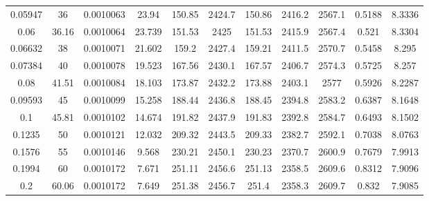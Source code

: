\begin{longtable}{ccccccccccc}
0.05947  & 36          & 0.0010063              & 23.94               & 150.85                 & 2424.7              & 150.86          & 2416.2       & 2567.1       & 0.5188         & 8.3336      \\
0.06     & 36.16       & 0.0010064              & 23.739              & 151.53                 & 2425                & 151.53          & 2415.9       & 2567.4       & 0.521          & 8.3304      \\
0.06632  & 38          & 0.0010071              & 21.602              & 159.2                  & 2427.4              & 159.21          & 2411.5       & 2570.7       & 0.5458         & 8.295       \\
0.07384  & 40          & 0.0010078              & 19.523              & 167.56                 & 2430.1              & 167.57          & 2406.7       & 2574.3       & 0.5725         & 8.257       \\
0.08     & 41.51       & 0.0010084              & 18.103              & 173.87                 & 2432.2              & 173.88          & 2403.1       & 2577         & 0.5926         & 8.2287      \\
0.09593  & 45          & 0.0010099              & 15.258              & 188.44                 & 2436.8              & 188.45          & 2394.8       & 2583.2       & 0.6387         & 8.1648      \\
0.1      & 45.81       & 0.0010102              & 14.674              & 191.82                 & 2437.9              & 191.83          & 2392.8       & 2584.7       & 0.6493         & 8.1502      \\
0.1235   & 50          & 0.0010121              & 12.032              & 209.32                 & 2443.5              & 209.33          & 2382.7       & 2592.1       & 0.7038         & 8.0763      \\
0.1576   & 55          & 0.0010146              & 9.568               & 230.21                 & 2450.1              & 230.23          & 2370.7       & 2600.9       & 0.7679         & 7.9913      \\
0.1994   & 60          & 0.0010172              & 7.671               & 251.11                 & 2456.6              & 251.13          & 2358.5       & 2609.6       & 0.8312         & 7.9096      \\
0.2      & 60.06       & 0.0010172              & 7.649               & 251.38                 & 2456.7              & 251.4           & 2358.3       & 2609.7       & 0.832          & 7.9085      \\

\end{longtable}
